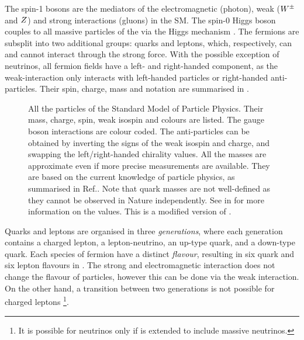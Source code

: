 The spin-1 bosons are the mediators of the electromagnetic (photon), weak ($W^\pm$ and $Z$) and strong interactions (gluons) in the SM.
The spin-0 Higgs boson couples to all massive particles of the \SM via the Higgs mechanism \cite{PhysRevLett.13.508}.
The fermions are subsplit into two additional groups: quarks and leptons, which, respectively, can and cannot interact through the strong force.
With the possible exception of neutrinos, all fermion fields have a left- and right-handed component, as the weak-interaction only interacts with
left-handed particles or right-handed anti-particles.
Their spin, charge, mass and notation are summarised in .
\begin{figure}[htbp!]
    \centering
    
    \caption{\label{fig:standard_model} All the particles of the Standard Model of Particle Physics.
    Their mass, charge, spin, weak isospin and colours are listed.
    The gauge boson interactions are colour coded.
    The anti-particles can be obtained by inverting the signs of the weak isospin and charge, and swapping the left/right-handed chirality values.
    All the masses are approximate even if more precise measurements are available.
    They are based on the current knowledge of particle physics, as summarised in Ref.\cite{Workman:2022ynf}.
    Note that quark masses are not well-defined as they cannot be observed in Nature independently.
    See in \cite{Workman:2022ynf} for more information on the values.
    This is a modified version of \cite{sm_diagram}.
    }
\end{figure}

Quarks and leptons are organised in three \textit{generations}, 
where each generation contains a charged lepton, a lepton-neutrino, an up-type quark, and a down-type quark.
Each species of fermion have a distinct \textit{flavour}, resulting in six quark and six lepton flavours in \SM.
The strong and electromagnetic interaction does not change the flavour of particles, 
however this can be done via the weak interaction.
On the other hand, a transition between two generations is not possible for charged leptons
\footnote{It is possible for neutrinos only if \SM is extended to include massive neutrinos.}.

